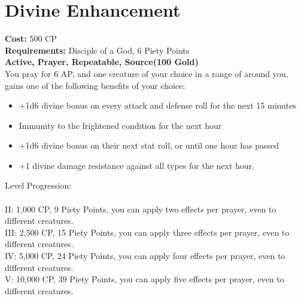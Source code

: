 \section{Divine Enhancement}\label{prayer:divineEnhancement}
\textbf{Cost:} 500 CP\\
\textbf{Requirements:} Disciple of a God, 6 Piety Points \\
\textbf{Active, Prayer, Repeatable, Source(100 Gold)}\\
You pray for 6 AP, and one creature of your choice in a range of  around you, gains one of the following benefits of your choice:
\begin{itemize}
	\item +1d6 divine bonus on every attack and defense roll for the next 15 minutes
	\item Immunity to the frightened condition for the next hour
	\item +1d6 divine bonus on their next stat roll, or until one hour has passed
	\item +1 divine damage resistance against all types for the next hour.
\end{itemize}

Level Progression:\\
\\
II: 1,000 CP, 9 Piety Points, you can apply two effects per prayer, even to different creatures.\\
III: 2,500 CP, 15 Piety Points, you can apply three effects per prayer, even to different creatures.\\
IV: 5,000 CP, 24 Piety Points, you can apply four effects per prayer, even to different creatures.\\
V: 10,000 CP, 39 Piety Points, you can apply five effects per prayer, even to different creatures.\\
